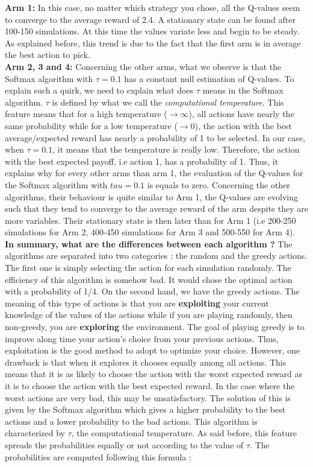 \documentclass{article}
\begin{document}
\noindent 
\textbf{Arm 1:}  In this case, no matter which strategy you chose, all the Q-values seem to converge to the average reward of 2.4. A stationary state can be found after 100-150 simulations. At this time the values variate less and begin to be steady. As explained before, this trend is due to the fact that the first arm is in average the best action to pick. \\

\noindent 
\textbf{Arm 2, 3 and 4:} Concerning the other arms, what we observe is that the Softmax algorithm with $\tau = 0.1$ has a constant null estimation of Q-values. To explain such a quirk, we need to explain what does $\tau$ means in the Softmax algorithm. $\tau$ is defined by what we call the \textit{computational temperature}. This feature means that for a high temperature ($\rightarrow \infty$), all actions have nearly the same probability while for a low temperature ($\rightarrow 0$), the action with the best average/expected reward has nearly a probability of 1 to be selected. In our case, when $\tau = 0.1$, it means that the temperature is really low. Therefore, the action with the best expected payoff, i.e action 1, has a probability of 1. Thus, it explains why for every other arms than arm 1, the evaluation of the Q-values for the Softmax algorithm with $tau = 0.1$ is equals to zero. Concerning the other algorithms, their behaviour is quite similar to Arm 1, the Q-values are evolving such that they tend to converge to the average reward of the arm despite they are more variables. Their stationary state is then later than for Arm 1 (i.e 200-250 simulations for Arm 2, 400-450 simulations for Arm 3 and 500-550 for Arm 4). \\

\noindent
\textbf{In summary, what are the differences between each algorithm ?} The algorithms are separated into two categories : the random and the greedy actions. The first one is simply selecting the action for each simulation randomly. The efficiency of this algorithm is somehow bad. It would chose the optimal action with a probability of 1/4. On the second hand, we have the greedy actions. The meaning of this type of actions is that you are \textbf{exploiting} your current knowledge of the values of the actions while if you are playing randomly, then non-greedy, you are \textbf{exploring} the environment. The goal of playing greedy is to improve along time your action's choice from your previous actions. Thus, exploitation is the good method to adopt to optimize your choice. However, one drawback is that when it explores it chooses equally among all actions. This means that it is as likely to choose the action with the worst expected reward as it is to choose the action with the best expected reward. In the case where the worst actions are very bad, this may be unsatisfactory. The solution of this is given by the Softmax algorithm which gives a higher probability to the best actions and a lower probability to the bad actions. This algorithm is characterized by $\tau$, the computational temperature. As said before, this feature spreads the probabilities equally or not according to the value of $\tau$. The probabilities are computed following this formula : 
\end{document}

